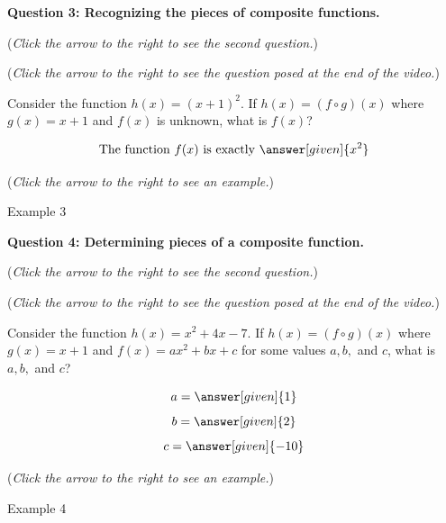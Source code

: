 \documentclass{ximera}
\begin{document}
\textbf{Question 3: Recognizing the pieces of composite functions.}
\begin{question}
\begin{flushright}
{\color{blue}(\emph{Click the arrow to the right to see the second question.})}
\end{flushright}
\begin{center}
\begin{expandable}
{\color{blue}(\emph{Click the arrow to the right to see the question
posed at the end of the video.})}
\begin{expandable}
Consider the function $h(x) = (x + 1)^2$. If $h(x) = (f\circ g)(x)$ where $g(x) = x+1$ and $f(x)$ is unknown, what is $f(x)$?\\
\begin{prompt}
\[
\text{The function }f(x) \text{ is exactly }\answer[given]{x^2}
\]
\end{prompt}
\begin{flushright}
{\color{blue}(\emph{Click the arrow to the right to see an example.})}
\end{flushright}
\begin{expandable}
Example 3
\end{expandable}
\end{expandable}
\end{expandable}
\end{center}
\end{question}


\textbf{Question 4: Determining pieces of a composite function.}
\begin{question}
\begin{flushright}
{\color{blue}(\emph{Click the arrow to the right to see the second question.})}
\end{flushright}
\begin{center}
\begin{expandable}
{\color{blue}(\emph{Click the arrow to the right to see the question
posed at the end of the video.})}
\begin{expandable}
Consider the function $h(x) = x^2 + 4x - 7$. If
$h(x) = (f\circ g)(x)$ where $g(x) = x+1$ and
$f(x) = ax^2 + bx + c$ for some values $a,b,$
and $c$, what is $a, b,$ and $c$?\\
\begin{prompt}
\[
a = \answer[given]{1}
\]
\[
b = \answer[given]{2}
\]
\[
c = \answer[given]{-10}
\]
\end{prompt}
\begin{flushright}
{\color{blue}(\emph{Click the arrow to the right to see an example.})}
\end{flushright}
\begin{expandable}
Example 4
\end{expandable}
\end{expandable}
\end{expandable}
\end{center}
\end{question}
\end{document}
